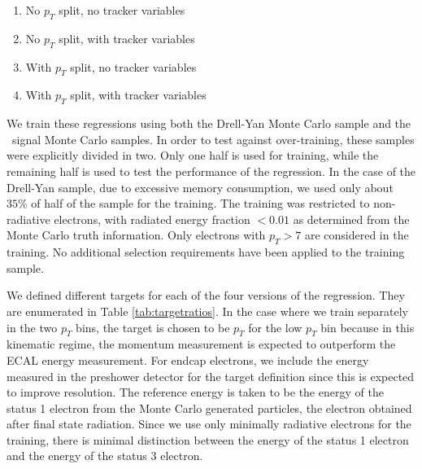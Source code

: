 \documentclass{cmspaper}
\begin{document}
\begin{enumerate}
\item No $p_T$ split, no tracker variables
\item No $p_T$ split, with tracker variables
\item With $p_T$ split, no tracker variables
\item With $p_T$ split, with tracker variables
\end{enumerate}

We train these regressions using both the Drell-Yan Monte Carlo sample and the \HiggsToZZ\ signal Monte Carlo
samples. In order to test against over-training, these samples were explicitly divided in two. Only one half
is used for training, while the remaining half is used to test the performance of the regression. In the 
case of the Drell-Yan sample, due to excessive memory consumption, we used only about $35\%$ of
half of the sample for the training. 
The training was restricted to non-radiative electrons, with radiated energy fraction $< 0.01$ as determined
from the Monte Carlo truth information. Only electrons with $p_T > 7$ are considered in the training. No
additional selection requirements have been applied to the training sample. 

We defined different targets for each of the four versions of the regression. They are enumerated in Table \ref{tab:targetratios}. 
In the case where we train separately in the two $p_{T}$ bins, the target is chosen to be $p_{T}$ for the low $p_{T}$ bin 
because in this kinematic regime, the momentum measurement is expected to outperform the ECAL energy measurement.
For endcap electrons, we include the energy measured in the preshower detector for the target definition since this is 
expected to improve resolution. The reference energy is taken to be the energy of the status 1 electron
from the Monte Carlo generated particles, the electron obtained after final state radiation. 
Since we use only minimally radiative electrons for the training, 
there is minimal distinction between the energy of the status 1 electron and the energy of the status 3 electron.
\end{document}
